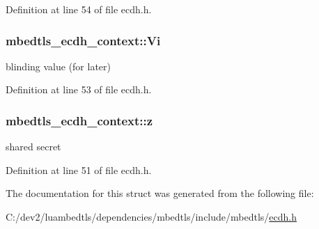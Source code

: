 Definition at line 54 of file ecdh.\-h.

\hypertarget{structmbedtls__ecdh__context_a6e374b0be49dce0fb02ca8ccfbfe1fee}{
\subsubsection[{Vi}]{ mbedtls\-\_\-ecdh\-\_\-context\-::\-Vi}}\label{structmbedtls__ecdh__context_a6e374b0be49dce0fb02ca8ccfbfe1fee}
blinding value (for later) 

Definition at line 53 of file ecdh.\-h.

\hypertarget{structmbedtls__ecdh__context_abfd253d99f23c57cbeafc41985db764c}{
\subsubsection[{z}]{ mbedtls\-\_\-ecdh\-\_\-context\-::z}}\label{structmbedtls__ecdh__context_abfd253d99f23c57cbeafc41985db764c}
shared secret 

Definition at line 51 of file ecdh.\-h.



The documentation for this struct was generated from the following file\-:\begin{DoxyCompactItemize}
\item 
C\-:/dev2/luambedtls/dependencies/mbedtls/include/mbedtls/\hyperlink{ecdh_8h}{ecdh.\-h}\end{DoxyCompactItemize}
